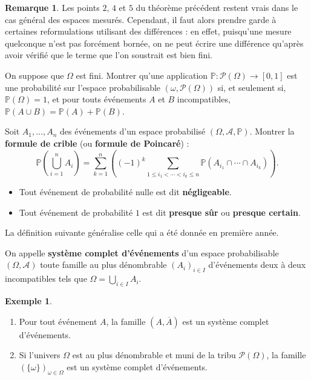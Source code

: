 \documentclass[french]{article}
\renewcommand{\P}{\mathbb{P}}
\theoremstyle{plain}
\theoremstyle{definition}
\newtheorem*{ex}{Exemple}
\newtheorem*{rmq}{Remarque}
\theoremstyle{remark}
\begin{document}
\begin{rmq}
	Les points $2$, $4$ et $5$ du théorème précédent restent vrais dans le cas général des espaces mesurés. Cependant, il faut alors prendre garde à certaines reformulations utilisant des différences : en effet, puisqu'une mesure quelconque n'est pas forcément bornée, on ne peut écrire une différence qu'après avoir vérifié que le terme que l'on soustrait est bien fini.
\end{rmq}

\begin{exo}
	On suppose que $\Omega$ est fini. Montrer qu'une application $\P:\mathcal{P}(\Omega)\to[0,1]$ est une probabilité sur l'espace probabilisable $(\omega,\mathcal{P}(\Omega))$ si, et seulement si, $\P(\Omega)=1$, et pour touts événements $A$ et $B$ incompatibles, $\P(A\cup B)=\P(A)+\P(B)$.
\end{exo}

\begin{exo}
	Soit $A_1,\ldots,A_n$ des événements d'un espace probabilisé $(\Omega,\mathcal{A},\P)$. Montrer la \textbf{formule de crible} (ou \textbf{formule de Poincaré}) :
	$$\P\left(\bigcup_{i=1}^nA_i\right)=\sum_{k=1}^{n}\left((-1)^k\sum_{1\leqslant i_1<\cdots<i_k\leqslant n}\P(A_{i_1}\cap\cdots\cap A_{i_k})\right).$$
\end{exo}

\begin{dfn}
	\begin{itemize}
		\item Tout événement de probabilité nulle est dit \textbf{négligeable}.
		\item Tout événement de probabilité $1$ est dit \textbf{presque sûr} ou \textbf{presque certain}.
	\end{itemize}
\end{dfn}

La définition suivante généralise celle qui a été donnée en première année.

\begin{dfn}
	On appelle \textbf{système complet d'événements} d'un espace probabilisable $(\Omega,\mathcal{A})$ toute famille au plus dénombrable $(A_i)_{i\in I}$ d'événements deux à deux incompatibles tels que $\Omega=\displaystyle\bigcup_{i\in I}A_i$. 
\end{dfn}

\begin{ex}
	\begin{enumerate}
		\item Pour tout événement $A$, la famille $(A,\overline{A})$ est un système complet d'événements.
		\item Si l'univers $\Omega$ est au plus dénombrable et muni de la tribu $\mathcal{P}(\Omega)$, la famille $(\{\omega\})_{\omega\in\Omega}$ est un système complet d'événements.
	\end{enumerate}
\end{ex}
\end{document}
